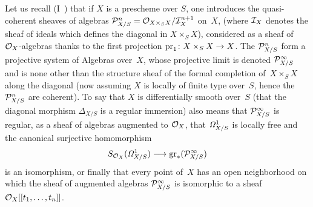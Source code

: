 \setcounter{theorem}{17}
\begingroup
\renewcommand{\theHtheorem}{\theHsection.\arabic{theorem}.bis}
\begin{remarks}
\label{rem:II.4.18}
Let us recall (I~) that if $X$ is a prescheme over
$S$, one introduces the quasi-coherent sheaves
of algebras
$\cal{P}_{X/S}^n=\cal{O}_{X\times_S X}/\cal{I}_X^{n+1}$ on~$X$,
(where $\cal{I}_X$ denotes the sheaf
of ideals
which defines the diagonal in $X\times_S X$), considered as
a sheaf of~$\cal{O}_X$-algebras thanks to the first
projection $\pr_1\colon X\times_S X\to X$. The
$\cal{P}_{X/S}^n$ form a projective system of Algebras over~$X$, whose projective limit is denoted $\cal{P}_{X/S}^{\infty}$
and is none other than the structure sheaf of the formal completion
of~$X\times_S X$ along the diagonal (now assuming $X$ is
locally of finite type over~$S$, hence the $\cal{P}_{X/S}^n$
are coherent). To say that $X$ is differentially smooth over~$S$
(\ie that the diagonal morphism $\Delta_{X/S}$ is a regular
immersion) also means that $\cal{P}_{X/S}^{\infty}$ is
regular, as a sheaf of algebras augmented to
$\cal{O}_X$, \ie that $\it{\Omega}_{X/S}^1$ is locally free and
the canonical surjective homomorphism
\[
S_{\cal{O}_X}(\it{\Omega}_{X/S}^1)\to
\mathrm{gr}_*(\cal{P}_{X/S}^{\infty})
\]
is an isomorphism, or finally that every point of~$X$
has an open neighborhood on which the sheaf of
augmented algebras $\cal{P}_{X/S}^{\infty}$ is isomorphic to a
sheaf $\cal{O}_X[[t_1,\dots,t_n]]$.


\end{remarks}
